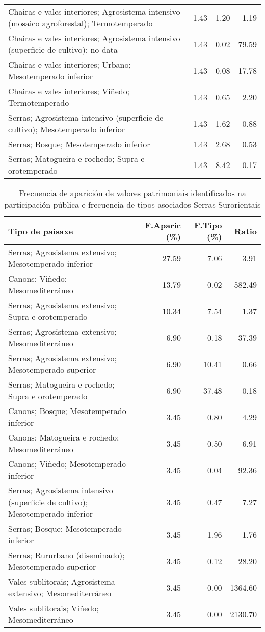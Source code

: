 \begin{table}[p]
\begin{tabular}{lrrr}
  Chairas e vales interiores; Agrosistema intensivo (mosaico agroforestal); Termotemperado & 1.43 & 1.20 & 1.19 \\ 
  Chairas e vales interiores; Agrosistema intensivo (superficie de cultivo); no data & 1.43 & 0.02 & 79.59 \\ 
  Chairas e vales interiores; Urbano; Mesotemperado inferior & 1.43 & 0.08 & 17.78 \\ 
  Chairas e vales interiores; Viñedo; Termotemperado & 1.43 & 0.65 & 2.20 \\ 
  Serras; Agrosistema intensivo (superficie de cultivo); Mesotemperado inferior & 1.43 & 1.62 & 0.88 \\ 
  Serras; Bosque; Mesotemperado inferior & 1.43 & 2.68 & 0.53 \\ 
  Serras; Matogueira e rochedo; Supra e orotemperado & 1.43 & 8.42 & 0.17 \\ 
   \hline
\end{tabular}
\end{table}
\begin{table}[p]
\centering
\caption{Frecuencia de aparición de valores patrimoniais identificados na participación pública e frecuencia de tipos asociados Serras Surorientais} 
\label{vsixotpat9}
\begin{tabular}{lrrr}
  \hline
Tipo de paisaxe & F.Aparic (\%) & F.Tipo (\%) & Ratio \\ 
  \hline
Serras; Agrosistema extensivo; Mesotemperado inferior & 27.59 & 7.06 & 3.91 \\ 
  Canons; Viñedo; Mesomediterráneo & 13.79 & 0.02 & 582.49 \\ 
  Serras; Agrosistema extensivo; Supra e orotemperado & 10.34 & 7.54 & 1.37 \\ 
  Serras; Agrosistema extensivo; Mesomediterráneo & 6.90 & 0.18 & 37.39 \\ 
  Serras; Agrosistema extensivo; Mesotemperado superior & 6.90 & 10.41 & 0.66 \\ 
  Serras; Matogueira e rochedo; Supra e orotemperado & 6.90 & 37.48 & 0.18 \\ 
  Canons; Bosque; Mesotemperado inferior & 3.45 & 0.80 & 4.29 \\ 
  Canons; Matogueira e rochedo; Mesomediterráneo & 3.45 & 0.50 & 6.91 \\ 
  Canons; Viñedo; Mesotemperado inferior & 3.45 & 0.04 & 92.36 \\ 
  Serras; Agrosistema intensivo (superficie de cultivo); Mesotemperado inferior & 3.45 & 0.47 & 7.27 \\ 
  Serras; Bosque; Mesotemperado inferior & 3.45 & 1.96 & 1.76 \\ 
  Serras; Rururbano (diseminado); Mesotemperado superior & 3.45 & 0.12 & 28.20 \\ 
  Vales sublitorais; Agrosistema extensivo; Mesomediterráneo & 3.45 & 0.00 & 1364.60 \\ 
  Vales sublitorais; Viñedo; Mesomediterráneo & 3.45 & 0.00 & 2130.70 \\ 
   \hline
\end{tabular}
\end{table}
